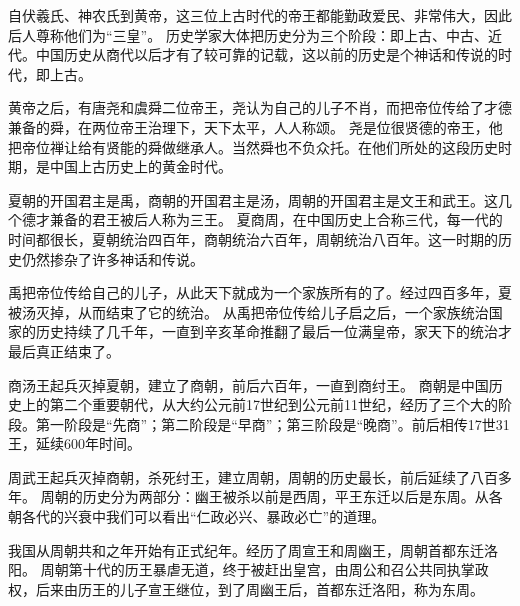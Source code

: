 \documentclass[avery5371,grid]{flashcards}
\begin{document}
{自伏羲氏、神农氏到黄帝，这三位上古时代的帝王都能勤政爱民、非常伟大，因此后人尊称他们为“三皇”。} %
{历史学家大体把历史分为三个阶段：即上古、中古、近代。中国历史从商代以后才有了较可靠的记载，这以前的历史是个神话和传说的时代，即上古。} %

{黄帝之后，有唐尧和虞舜二位帝王，尧认为自己的儿子不肖，而把帝位传给了才德兼备的舜，在两位帝王治理下，天下太平，人人称颂。} %
{尧是位很贤德的帝王，他把帝位禅让给有贤能的舜做继承人。当然舜也不负众托。在他们所处的这段历史时期，是中国上古历史上的黄金时代。} %

{夏朝的开国君主是禹，商朝的开国君主是汤，周朝的开国君主是文王和武王。这几个德才兼备的君王被后人称为三王。} %
{夏商周，在中国历史上合称三代，每一代的时间都很长，夏朝统治四百年，商朝统治六百年，周朝统治八百年。这一时期的历史仍然掺杂了许多神话和传说。} %

{禹把帝位传给自己的儿子，从此天下就成为一个家族所有的了。经过四百多年，夏被汤灭掉，从而结束了它的统治。} %
{从禹把帝位传给儿子启之后，一个家族统治国家的历史持续了几千年，一直到辛亥革命推翻了最后一位满皇帝，家天下的统治才最后真正结束了。} %

{商汤王起兵灭掉夏朝，建立了商朝，前后六百年，一直到商纣王。} %
{商朝是中国历史上的第二个重要朝代，从大约公元前17世纪到公元前11世纪，经历了三个大的阶段。第一阶段是“先商”；第二阶段是“早商”；第三阶段是“晚商”。前后相传17世31王，延续600年时间。} %

{周武王起兵灭掉商朝，杀死纣王，建立周朝，周朝的历史最长，前后延续了八百多年。} %
{周朝的历史分为两部分：幽王被杀以前是西周，平王东迁以后是东周。从各朝各代的兴衰中我们可以看出“仁政必兴、暴政必亡”的道理。} %



{我国从周朝共和之年开始有正式纪年。经历了周宣王和周幽王，周朝首都东迁洛阳。} %
{周朝第十代的历王暴虐无道，终于被赶出皇宫，由周公和召公共同执掌政权，后来由历王的儿子宣王继位，到了周幽王后，首都东迁洛阳，称为东周。} %
\end{document}
